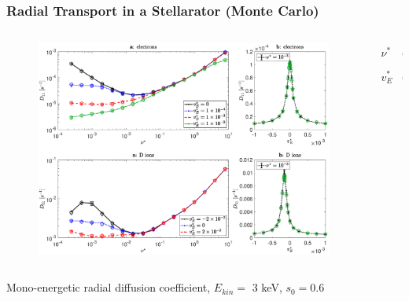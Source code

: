 \documentclass{beamer}
\newcommand{\bea}[1]{\begin{eqnarray} \label{#1}}
\newcommand{\eea}{\end{eqnarray}}
\begin{document}
\begin{frame}
\frametitle{Radial Transport in a Stellarator (Monte Carlo)}
\vspace{-1.2cm}
\hspace*{0.1cm}
\begin{columns}[t]
	\begin{column}{0.8\textwidth}
		\begin{figure}
			\vspace*{-1.05cm}
\hspace*{-0.5cm}\includegraphics[width=1\textwidth]{FIGURES/transport_coefficient_electrons_dions.eps}

\end{figure}
\end{column}
\hspace*{-1cm}
\begin{column}{0.2\textwidth}
	\vspace*{0.8cm}
	\bea*{} 
		\nu^{\ast} &=& \frac{R_0 \nu_c}{\iota v} \nonumber \\
		\quad \nonumber \\ 
		v_E^{\ast} &=& \frac{E_r}{v B_0} \nonumber
	\eea
	
	\end{column}
\end{columns}
Mono-energetic radial diffusion coefficient,\newline
$E_{kin}=$ 3 keV, $s_0 = 0.6$
\end{frame}
\end{document}
